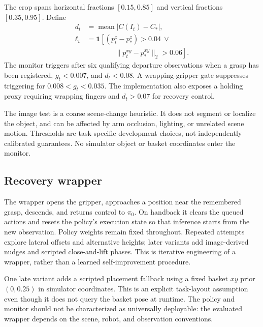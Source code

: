 \documentclass[10pt,twocolumn]{article}
\begin{document}
The crop spans horizontal fractions $[0.15,0.85]$ and vertical fractions $[0.35,0.95]$. Define
\begin{align}
 d_t &= \operatorname{mean}|C(I_t)-C_*|,\\
 \ell_t &= \mathbf{1}\left[(p_t^z-p_*^z)>0.04\ \lor\right.\nonumber\\[-4pt]
 &\hspace{48pt}\left.\|p_t^{xy}-p_*^{xy}\|_2>0.06\right].
\end{align}
The monitor triggers after six qualifying departure observations when a grasp has been registered, $g_t<0.007$, and $d_t<0.08$. A wrapping-gripper gate suppresses triggering for $0.008<g_t<0.035$. The implementation also exposes a holding proxy requiring wrapping fingers and $d_t>0.07$ for recovery control.

The image test is a coarse scene-change heuristic. It does not segment or localize the object, and can be affected by arm occlusion, lighting, or unrelated scene motion. Thresholds are task-specific development choices, not independently calibrated guarantees. No simulator object or basket coordinates enter the monitor.

\subsection{Recovery wrapper}
The wrapper opens the gripper, approaches a position near the remembered grasp, descends, and returns control to $\pi_0$. On handback it clears the queued actions and resets the policy's execution state so that inference starts from the new observation. Policy weights remain fixed throughout. Repeated attempts explore lateral offsets and alternative heights; later variants add image-derived nudges and scripted close-and-lift phases. This is iterative engineering of a wrapper, rather than a learned self-improvement procedure.

One late variant adds a scripted placement fallback using a fixed basket $xy$ prior $(0,0.25)$ in simulator coordinates. This is an explicit task-layout assumption even though it does not query the basket pose at runtime. The policy and monitor should not be characterized as universally deployable: the evaluated wrapper depends on the scene, robot, and observation conventions.
\end{document}
